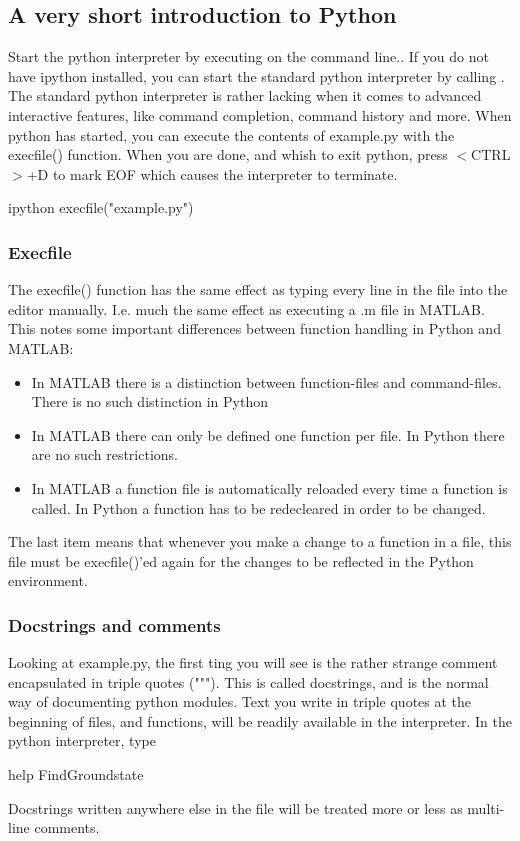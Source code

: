 \subsection{A very short introduction to Python}
Start the python interpreter by executing  on the command line.. If you do not have ipython installed, 
you can start the standard python interpreter by calling . The standard python 
interpreter is rather lacking when it comes to advanced interactive features, like command completion, command history and more. When python has started, you can execute the contents of example.py with the execfile() function. When you are done, 
and whish to exit python, press $<$CTRL$>$+D to mark EOF which causes the interpreter to terminate.
\begin{bash}
	ipython
	execfile("example.py")
\end{bash}

\subsubsection*{Execfile}
The execfile() function has the same effect as typing every line in the file into the editor manually. I.e. much the 
same effect as executing a .m file in MATLAB. This notes some important differences between function handling in 
Python and MATLAB:
\begin{itemize}
\item In MATLAB there is a distinction between function-files and command-files. There is no such distinction in Python
\item In MATLAB there can only be defined one function per file. In Python there are no such restrictions.
\item In MATLAB a function file is automatically reloaded every time a function is called. In Python a function has to
be redecleared in order to be changed. 
\end{itemize}
The last item means that whenever you make a change to a function in a file, this file must be execfile()'ed again for the
changes to be reflected in the Python environment.

\subsubsection*{Docstrings and comments}
Looking at example.py, the first ting you will see is the rather strange comment encapsulated in triple quotes ("""). This
is called docstrings, and is the normal way of documenting python modules. Text you write in triple quotes at the beginning 
of files, and functions, will be readily available in the interpreter. In the python interpreter, type
\begin{python}
	help FindGroundstate
\end{python}
Docstrings written anywhere else in the file will be treated more or less as multi-line comments. 

